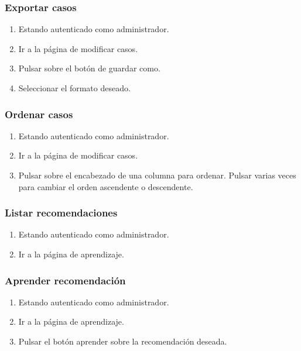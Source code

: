 \subsubsection{Exportar casos}

\begin{enumerate}
\item Estando autenticado como administrador.
\item Ir a la página de modificar casos.
\item Pulsar sobre el botón de guardar como.
\item Seleccionar el formato deseado.
\end{enumerate}

\subsubsection{Ordenar casos}

\begin{enumerate}
\item Estando autenticado como administrador.
\item Ir a la página de modificar casos.
\item Pulsar sobre el encabezado de una columna para ordenar. Pulsar varias veces para cambiar el orden ascendente o descendente.
\end{enumerate}

\subsubsection{Listar recomendaciones}

\begin{enumerate}
\item Estando autenticado como administrador.
\item Ir a la página de aprendizaje.
\end{enumerate}

\subsubsection{Aprender recomendación}

\begin{enumerate}
\item Estando autenticado como administrador.
\item Ir a la página de aprendizaje.
\item Pulsar el botón aprender sobre la recomendación deseada.
\end{enumerate}

